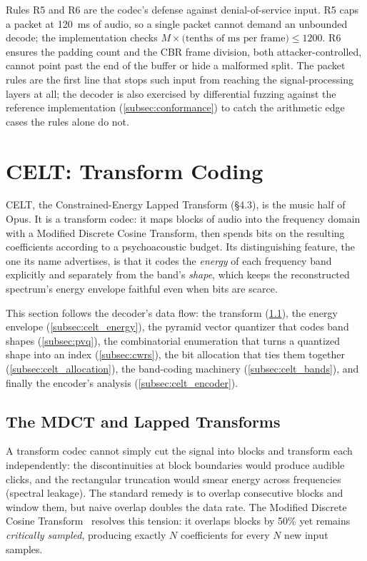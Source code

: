 \begin{importantnote}
  Rules R5 and R6 are the codec's defense against denial-of-service input. R5
  caps a packet at 120~ms of audio, so a single packet cannot demand an
  unbounded decode; the implementation checks $M \times \text{(tenths of ms per
  frame)} \le 1200$. R6 ensures the padding count and the CBR frame division,
  both attacker-controlled, cannot point past the end of the buffer or hide a
  malformed split. The packet rules are the first line that stops such input
  from reaching the signal-processing layers at all; the decoder is also
  exercised by differential fuzzing against the reference implementation
  (\cref{subsec:conformance}) to catch the arithmetic edge cases the rules
  alone do not.
\end{importantnote}

\section{CELT: Transform Coding}\label{sec:celt}

CELT, the Constrained-Energy Lapped Transform (\S4.3), is the music half of
Opus. It is a transform codec: it maps blocks of audio into the frequency domain
with a Modified Discrete Cosine Transform, then spends bits on the resulting
coefficients according to a psychoacoustic budget. Its distinguishing feature,
the one its name advertises, is that it codes the \emph{energy} of
each frequency
band explicitly and separately from the band's \emph{shape}, which keeps the
reconstructed spectrum's energy envelope faithful even when bits are scarce.

This section follows the decoder's data flow: the transform
(\cref{subsec:mdct}), the energy envelope (\cref{subsec:celt_energy}), the
pyramid vector quantizer that codes band shapes (\cref{subsec:pvq}), the
combinatorial enumeration that turns a quantized shape into an index
(\cref{subsec:cwrs}), the bit allocation that ties them together
(\cref{subsec:celt_allocation}), the band-coding machinery
(\cref{subsec:celt_bands}), and finally the encoder's analysis
(\cref{subsec:celt_encoder}).

\subsection{The MDCT and Lapped Transforms}\label{subsec:mdct}

A transform codec cannot simply cut the signal into blocks and transform each
independently: the discontinuities at block boundaries would produce audible
clicks, and the rectangular truncation would smear energy across frequencies
(spectral leakage). The standard remedy is to overlap consecutive blocks and
window them, but naive overlap doubles the data rate. The Modified Discrete
Cosine Transform~\cite{princen1986analysis,princen1987subband} resolves this
tension: it overlaps blocks by 50\% yet remains \emph{critically sampled},
producing exactly $N$ coefficients for every $N$ new input samples.

